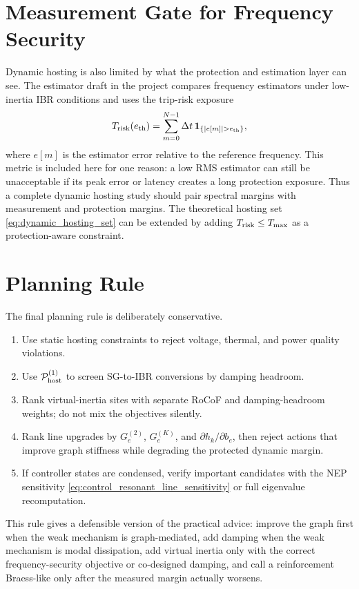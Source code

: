 \FloatBarrier

\section{Measurement Gate for Frequency Security}

Dynamic hosting is also limited by what the protection and estimation layer can
see. The estimator draft in the project compares frequency estimators under
low-inertia IBR conditions and uses the trip-risk exposure
\begin{equation}
  T_{\rm risk}(e_{\rm th})
  =
  \sum_{m=0}^{N-1}\Delta t\,
  \mathbf 1_{\{|e[m]|>e_{\rm th}\}},
  \label{eq:trip_risk_duration}
\end{equation}
where \(e[m]\) is the estimator error relative to the reference frequency.
This metric is included here for one reason: a low RMS estimator can still be
unacceptable if its peak error or latency creates a long protection exposure.
Thus a complete dynamic hosting study should pair spectral margins with
measurement and protection margins. The theoretical hosting set
\eqref{eq:dynamic_hosting_set} can be extended by adding
\(T_{\rm risk}\le T_{\rm max}\) as a protection-aware constraint.

\section{Planning Rule}

The final planning rule is deliberately conservative.

\begin{enumerate}
\item Use static hosting constraints to reject voltage, thermal, and power
quality violations.
\item Use \(\mathcal P_{\rm host}^{(1)}\) to screen SG-to-IBR conversions by
damping headroom.
\item Rank virtual-inertia sites with separate RoCoF and damping-headroom
weights; do not mix the objectives silently.
\item Rank line upgrades by \(G_e^{(2)}\), \(G_e^{(K)}\), and
\(\partial h_k/\partial b_e\), then reject actions that improve graph
stiffness while degrading the protected dynamic margin.
\item If controller states are condensed, verify important candidates with the
NEP sensitivity \eqref{eq:control_resonant_line_sensitivity} or full
eigenvalue recomputation.
\end{enumerate}

This rule gives a defensible version of the practical advice: improve the
graph first when the weak mechanism is graph-mediated, add damping when the
weak mechanism is modal dissipation, add virtual inertia only with the correct
frequency-security objective or co-designed damping, and call a reinforcement
Braess-like only after the measured margin actually worsens.

